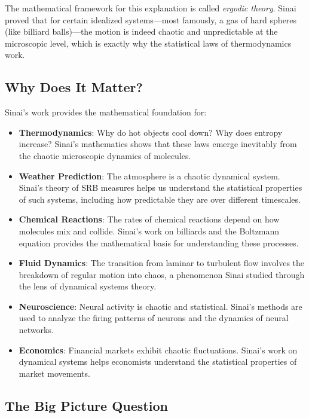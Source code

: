 The mathematical framework for this explanation is called \emph{ergodic theory}. Sinai proved that for certain idealized systems---most famously, a gas of hard spheres (like billiard balls)---the motion is indeed chaotic and unpredictable at the microscopic level, which is exactly why the statistical laws of thermodynamics work.

\subsection{Why Does It Matter?}

Sinai's work provides the mathematical foundation for:
\begin{itemize}
\item \textbf{Thermodynamics}: Why do hot objects cool down? Why does entropy increase? Sinai's mathematics shows that these laws emerge inevitably from the chaotic microscopic dynamics of molecules.

\item \textbf{Weather Prediction}: The atmosphere is a chaotic dynamical system. Sinai's theory of SRB measures helps us understand the statistical properties of such systems, including how predictable they are over different timescales.

\item \textbf{Chemical Reactions}: The rates of chemical reactions depend on how molecules mix and collide. Sinai's work on billiards and the Boltzmann equation provides the mathematical basis for understanding these processes.

\item \textbf{Fluid Dynamics}: The transition from laminar to turbulent flow involves the breakdown of regular motion into chaos, a phenomenon Sinai studied through the lens of dynamical systems theory.

\item \textbf{Neuroscience}: Neural activity is chaotic and statistical. Sinai's methods are used to analyze the firing patterns of neurons and the dynamics of neural networks.

\item \textbf{Economics}: Financial markets exhibit chaotic fluctuations. Sinai's work on dynamical systems helps economists understand the statistical properties of market movements.
\end{itemize}

\subsection{The Big Picture Question}

